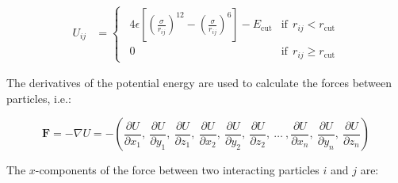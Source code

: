 \documentclass{article}
\begin{document}

\begin{eqnarray}
    U_{ij} &= 
    \begin{cases}
        \ \ 4 \epsilon \left[ \left(\frac{\sigma}{r_{ij}} \right)^{12} - \left(\frac{\sigma}{r_{ij}} \right)^6 \right] -E_{\mathrm{cut}} & \mathrm{if}\ \ r_{ij} < r_{\mathrm{cut}}\\
        \ \ 0 & \mathrm{if}\ \ r_{ij} \ge  r_{\mathrm{cut}}
    \end{cases}
\end{eqnarray}

The derivatives of the potential energy are used to calculate the forces
between particles, i.e.:

\begin{equation}
    \mathbf{F} = -\nabla U =
    -\left(
        \frac{\partial U}{\partial x_1},\
        \frac{\partial U}{\partial y_1},\
        \frac{\partial U}{\partial z_1},\
        \frac{\partial U}{\partial x_2},\
        \frac{\partial U}{\partial y_2},\
        \frac{\partial U}{\partial z_2},\
        \ldots\ ,
        \frac{\partial U}{\partial x_n},\
        \frac{\partial U}{\partial y_n},\
        \frac{\partial U}{\partial z_n}
    \right)
\end{equation}

The $x$-components of the force between two interacting particles $i$ and $j$
are:

\end{document}
